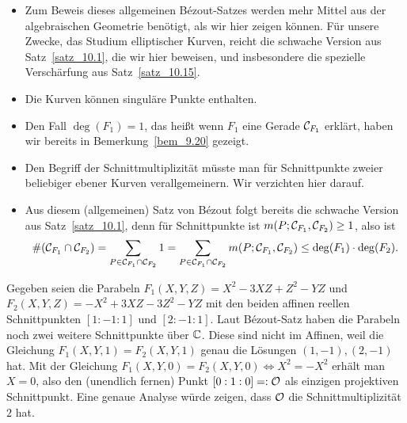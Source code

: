 \begin{bem}
	\begin{itemize}
		\item Zum Beweis dieses allgemeinen Bézout-Satzes werden mehr Mittel aus der algebraischen Geometrie benötigt, als wir hier zeigen können. Für unsere Zwecke, das Studium elliptischer Kurven, reicht die schwache Version aus Satz~\ref{satz_10.1}, die wir hier beweisen, und insbesondere die spezielle Verschärfung aus Satz~\ref{satz_10.15}.
		\item Die Kurven können singuläre Punkte enthalten.
		\item Den Fall $\deg(F_1) = 1$, das heißt wenn $F_1$ eine Gerade $\mathcal{C}_{F_1}$ erklärt, haben wir bereits in Bemerkung~\ref{bem_9.20} gezeigt.
		\item Den Begriff der Schnittmultiplizität müsste man für Schnittpunkte zweier beliebiger ebener Kurven verallgemeinern. Wir verzichten hier darauf.
		\item Aus diesem (allgemeinen) Satz von Bézout folgt bereits die schwache Version aus Satz~\ref{satz_10.1}, denn für Schnittpunkte ist $m(P;\mathcal{C}_{F_1},\mathcal{C}_{F_2}) \geq 1$, also ist
		\[ \#(\mathcal{C}_{F_1} \cap \mathcal{C}_{F_2}) = \sum_{P \in \mathcal{C}_{F_1} \cap \mathcal{C}_{F_2}} 1 = \sum_{P \in \mathcal{C}_{F_1} \cap \mathcal{C}_{F_2}} m(P;\mathcal{C}_{F_1},\mathcal{C}_{F_2}) \leq \deg(F_1) \cdot \deg(F_2).\]
	\end{itemize}
\end{bem}

\begin{bsp}
	Gegeben seien die Parabeln $F_1(X,Y,Z) = X^2 - 3XZ+Z^2-YZ$ und $F_2(X,Y,Z) = -X^2 + 3XZ - 3Z^2 - YZ$ mit den beiden affinen reellen Schnittpunkten $[1:-1:1]$ und $[2:-1:1]$. Laut Bézout-Satz haben die Parabeln noch zwei weitere Schnittpunkte über $\mathbb{C}$. Diese sind nicht im Affinen, weil die Gleichung $F_1(X,Y,1) = F_2(X,Y,1)$ genau die Lösungen $(1,-1),(2,-1)$ hat. Mit der Gleichung $F_1(X,Y,0) = F_2(X,Y,0) \Leftrightarrow X^2 = -X^2$ erhält man $X = 0$, also den (unendlich fernen) Punkt $[0:1:0] =: \mathcal{O}$ als einzigen projektiven Schnittpunkt. Eine genaue Analyse würde zeigen, dass $\mathcal{O}$ die Schnittmultiplizität $2$ hat.
\end{bsp}


